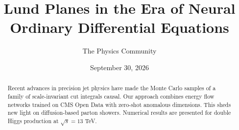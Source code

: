 \documentclass[11pt]{article}
\title{Lund Planes in the Era of Neural Ordinary Differential Equations}
\author{The Physics Community}
\date{September 30, 2026}
\numberwithin{equation}{section}
\theoremstyle{definition}
\theoremstyle{remark}
\begin{document}
\maketitle
\begin{abstract}
Recent advances in precision jet physics have made the Monte Carlo
samples of a family of scale-invariant cut integrals causal. Our
approach combines energy flow networks trained on CMS Open Data with
zero-shot anomalous dimensions. This sheds new light on diffusion-based
parton showers. Numerical results are presented for double Higgs
production at $\sqrt{s} = 13$ TeV.
\end{abstract}
\tableofcontents



\nocite{*}


\end{document}
